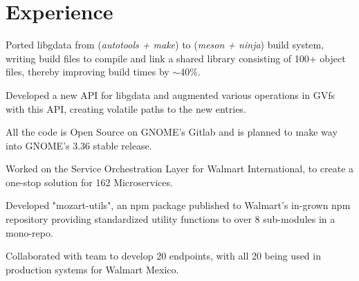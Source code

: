 \documentclass[]{deedy-resume-reversed}
\begin{document}
\begin{minipage}[t]{0.60\textwidth}


\section{Experience}
\vspace{10pt} %
\begin{tightemize}
\item Ported libgdata from (\textit{autotools + make}) to (\textit{meson + ninja}) build system, writing build files to compile and link a shared library consisting of  100+ object files, thereby improving build times by $\sim$40\%.
\item Developed a new API for libgdata and augmented various operations in GVfs with this API, creating volatile paths to the new entries.
\item All the code is Open Source on GNOME's Gitlab and is planned to make way into GNOME's 3.36 stable release.
\end{tightemize}
\sectionsep

\begin{tightemize}
    \item Worked on the Service Orchestration Layer for Walmart International, to create a one-stop solution for 162 Microservices.
    \item Developed "mozart-utils", an npm package published to Walmart's in-grown npm repository providing standardized utility functions to over 8 sub-modules in a mono-repo.
    \item Collaborated with team to develop 20 endpoints, with all 20 being used in production systems for Walmart Mexico.
\end{tightemize}
\sectionsep


\end{minipage}
\end{document}
